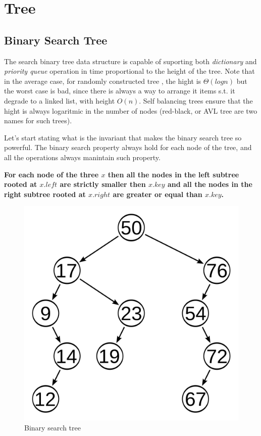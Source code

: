 \chapter{Tree}

\section{Binary Search Tree}
The search binary tree data structure is capable of suporting both \textit{dictionary} and \textit{priority queue} operation in time proportional to the height of the tree.
Note that in the average case, for randomly constructed tree , the hight is $\Theta(log n)$ but the worst case is bad, since there is always a way to arrange it items s.t. it degrade to a linked list, with height $O(n)$. Self balancing trees ensure that the hight is always logaritmic in the number of nodes (red-black, or AVL tree are two names for such trees).

Let's start stating what is the invariant that makes the binary search tree so powerful. The binary search property always hold for each node of the tree, and all the operations always manintain such property.


\textbf{For each node of the three $x$ then all the nodes in the left subtree rooted at $x.left$ are strictly smaller  then $x.key$ and all the nodes in the right subtree rooted at $x.right$ are greater or equal than $x.key$.
}

	\begin{figure}
	\label{fig:tree_visits}
	\centering
		\includegraphics[scale=0.1]{../images/tree_unbl}
		\caption{Binary search tree}
	\end{figure}

